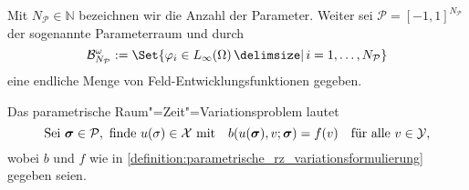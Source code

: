 \documentclass[../main.tex]{subfiles}
\begin{document}
\begin{Bemerkung}
    Mit $N_{\mathcal P} \in \mathbb{N}$ bezeichnen wir die Anzahl der Parameter.
    Weiter sei $\mathcal P = [-1, 1]^{N_{\mathcal P}}$ der sogenannte Parameterraum und durch
    \begin{equation}
        \mathcal B^{\omega}_{N_{\mathcal P}} := \Set{ \varphi_{i} \in L_{\infty}(\Omega) \given i = 1, \dots, N_{\mathcal P}}
    \end{equation}
    eine endliche Menge von Feld-Entwicklungsfunktionen gegeben.
\end{Bemerkung}

\begin{Bemerkung}
    Das parametrische Raum"=Zeit"=Variationsproblem lautet
    \begin{equation}
    \label{eq:wiederholung_variationsproblem}
        \text{Sei }\bm \sigma \in \mathcal P, \text{ finde } u(\sigma) \in \mathcal X \text{ mit} \quad b(u(\bm \sigma), v; \bm \sigma) = f(v) \quad \fa v \in \mathcal Y,
    \end{equation}
    wobei $b$ und $f$ wie in \cref{definition:parametrische_rz_variationsformulierung} gegeben seien.
\end{Bemerkung}
\end{document}
